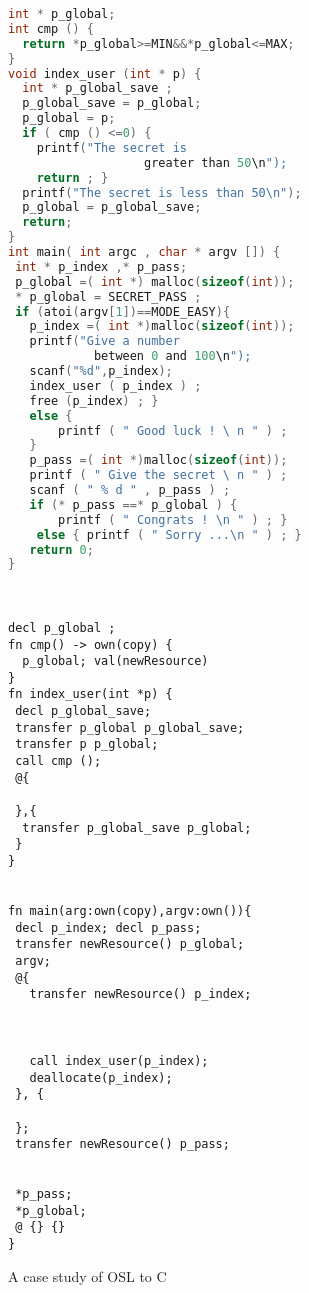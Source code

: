 \documentclass[runningheads]{llncs}
\begin{document}
\begin{figure}[t]
\begin{minipage}{0.5\textwidth}
	\renewcommand{\ttdefault}{pcr}
\begin{lstlisting}[language=C]
int * p_global;
int cmp () { 
  return *p_global>=MIN&&*p_global<=MAX;
} 
void index_user (int * p) {                                                                                                                                                            
  int * p_global_save ; 
  p_global_save = p_global; 
  p_global = p; 
  if ( cmp () <=0) { 
    printf("The secret is 
                   greater than 50\n"); 
    return ; }
  printf("The secret is less than 50\n");
  p_global = p_global_save; 
  return;
}     
int main( int argc , char * argv []) {                                                                                                                                            
 int * p_index ,* p_pass; 
 p_global =( int *) malloc(sizeof(int));
 * p_global = SECRET_PASS ;
 if (atoi(argv[1])==MODE_EASY){ 
   p_index =( int *)malloc(sizeof(int));
   printf("Give a number 
            between 0 and 100\n"); 
   scanf("%d",p_index); 
   index_user ( p_index ) ;
   free (p_index) ; } 
   else { 
       printf ( " Good luck ! \ n " ) ; 
   } 
   p_pass =( int *)malloc(sizeof(int));  
   printf ( " Give the secret \ n " ) ;
   scanf ( " % d " , p_pass ) ;
   if (* p_pass ==* p_global ) { 
       printf ( " Congrats ! \n " ) ; }
    else { printf ( " Sorry ...\n " ) ; } 
   return 0; 
}                               
\end{lstlisting}
\end{minipage}
~~~~~~~~~~
\begin{minipage}{0.43\textwidth}
	\renewcommand{\ttdefault}{pcr}
\begin{lstlisting}
decl p_global ;
fn cmp() -> own(copy) {
  p_global; val(newResource)
}
fn index_user(int *p) {
 decl p_global_save;
 transfer p_global p_global_save;
 transfer p p_global;
 call cmp ();
 @{

 },{
  transfer p_global_save p_global;
 }
}


fn main(arg:own(copy),argv:own()){
 decl p_index; decl p_pass;
 transfer newResource() p_global;
 argv;
 @{
   transfer newResource() p_index;
   
   
   
   call index_user(p_index);
   deallocate(p_index);
 }, {
 
 };
 transfer newResource() p_pass;


 *p_pass;
 *p_global;
 @ {} {}
}
\end{lstlisting}
\end{minipage}
\caption{A case study of OSL to C}
\label{fig:osltoc}
\vspace{-0.5cm}
\end{figure}
\end{document}
